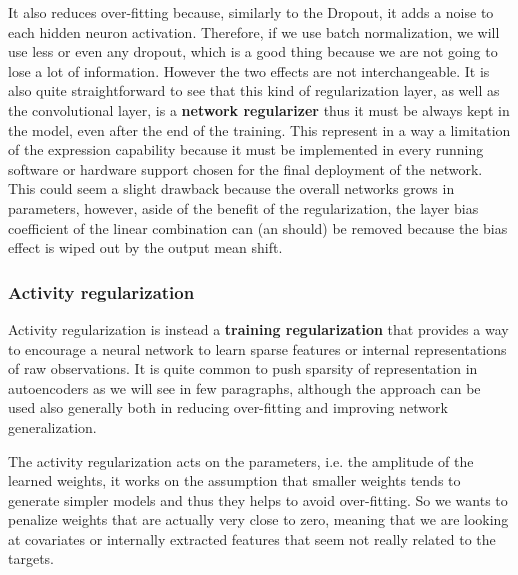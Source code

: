 It also reduces over-fitting because, similarly to the Dropout, it adds a noise to each hidden neuron activation. Therefore, if we use batch normalization, we will use less or even any dropout, which is a good thing because we are not going to lose a lot of information. However the two effects are not interchangeable.
%
It is also quite straightforward to see that this kind of regularization layer, as well as the convolutional layer, is a \textbf{network regularizer} thus it must be always kept in the model, even after the end of the training. This represent in a way a limitation of the expression capability because it must be implemented in every running software or hardware support chosen for the final deployment of the network. This could seem a slight drawback because the overall networks grows in parameters, however, aside of the benefit of the regularization, the layer bias coefficient of the linear combination can (an should) be removed because the bias effect is wiped out by the output mean shift.

\subsubsection{Activity regularization}
Activity regularization is instead a \textbf{training regularization} that provides a way to encourage a neural network to learn sparse features or internal representations of raw observations.
It is quite common to push sparsity of representation in autoencoders as we will see in few paragraphs, although the approach can be used also generally both in reducing over-fitting and improving network generalization.

The activity regularization acts on the parameters, i.e. the amplitude of the learned weights, it works on the assumption that smaller weights tends to generate simpler models and thus they helps to avoid over-fitting. So we wants to penalize weights that are actually very close to zero, meaning that we are looking at covariates or internally extracted features that seem not really related to the targets.

